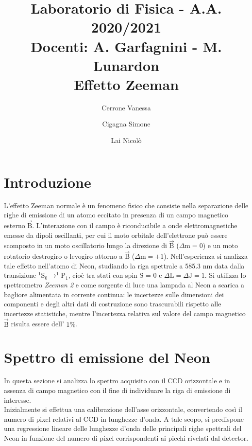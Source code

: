 \documentclass[twocolumn,10pt]{asme2ej}
\date{}
\title{{\huge\bfseries Laboratorio di Fisica} - {\LARGE A.A. 2020/2021} \\ 
    {\LARGE Docenti: A. Garfagnini - M. Lunardon} \\ {\Huge\bfseries Effetto Zeeman}}
\author{Cerrone Vanessa
    \affiliation{
    1200361\\
    vanessa.cerrone@studenti.unipd.it
    }	
}
\author{Cigagna Simone
    \affiliation{
	1193992\\
    simone.cigagna@studenti.unipd.it
    }	
}
\author{Lai Nicolò
    \affiliation{
	1193976\\
    nicolo.lai@studenti.unipd.it
    }	
}
\begin{document}
\maketitle    


\section{Introduzione}\label{s:introduzione}

L'effetto Zeeman normale è un fenomeno fisico che consiste nella separazione delle righe di emissione di un atomo
eccitato in presenza di un campo magnetico esterno $\vec{\text{B}}$. L'interazione con il campo è riconducibile a onde
elettromagnetiche emesse da dipoli oscillanti, per cui il moto orbitale dell'elettrone può essere scomposto in un moto
oscillatorio lungo la direzione di $\vec{\text{B}}$ ($\Delta \text{m} = 0$) e un moto rotatorio destrogiro o levogiro
attorno a $\vec{\text{B}}$ ($\Delta \text{m} = \pm1$). Nell'esperienza si analizza tale effetto nell'atomo di Neon,
studiando la riga spettrale a 585.3 \si{\nano \metre} data dalla transizione $ ^1\text{S}_0 \rightarrow ^1\text{P}_1$,
cioè tra stati con spin S = 0 e $\Delta \text{L}= \Delta \text{J} = 1$. Si utilizza lo spettrometro \textit{Zeeman 2} e
come sorgente di luce una lampada al Neon a scarica a bagliore alimentata in corrente continua: le incertezze sulle
dimensioni dei componenti e degli altri dati di costruzione sono trascurabili rispetto alle incertezze statistiche,
mentre l'incertezza relativa sul valore del campo magnetico $\vec{\text{B}}$ risulta essere dell' $1\%$.   \\




\section{Spettro di emissione del Neon}\label{s:neon}

In questa sezione si analizza lo spettro acquisito con il CCD orizzontale e in assenza di campo magnetico con il fine di
individuare la riga di emissione di interesse.  \\
Inizialmente si effettua una calibrazione dell'asse orizzontale, convertendo così il numero di pixel relativi al CCD in
lunghezze d'onda. A tale scopo, si predispone una regressione lineare delle lunghezze d'onda delle principali righe
spettrali del Neon in funzione del numero di pixel corrispondenti ai picchi rivelati dal detector. 
 
\end{document}
